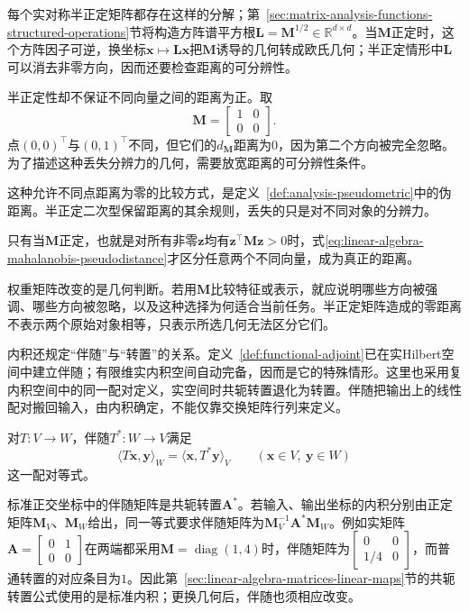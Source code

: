 每个实对称半正定矩阵都存在这样的分解；第~\ref{sec:matrix-analysis-functions-structured-operations}节将构造方阵谱平方根$\bm{L}=\bm{M}^{1/2}\in\mathbb{R}^{d\times d}$。当$\bm{M}$正定时，这个方阵因子可逆，换坐标$\bm{x}\mapsto\bm{L}\bm{x}$把$\bm{M}$诱导的几何转成欧氏几何；半正定情形中$\bm{L}$可以消去非零方向，因而还要检查距离的可分辨性。

半正定性却不保证不同向量之间的距离为正。取
\[
  \bm{M}
  =
  \begin{bmatrix} 1&0\\0&0 \end{bmatrix}.
\]
点$(0,0)^{\top}$与$(0,1)^{\top}$不同，但它们的$d_{\bm{M}}$距离为$0$，因为第二个方向被完全忽略。为了描述这种丢失分辨力的几何，需要放宽距离的可分辨性条件。

这种允许不同点距离为零的比较方式，是定义~\ref{def:analysis-pseudometric}中的伪距离。半正定二次型保留距离的其余规则，丢失的只是对不同对象的分辨力。

只有当$\bm{M}$正定，也就是对所有非零$\bm{z}$均有$\bm{z}^{\top}\bm{M}\bm{z}>0$时，式\eqref{eq:linear-algebra-mahalanobis-pseudodistance}才区分任意两个不同向量，成为真正的距离。

权重矩阵改变的是几何判断。若用$\bm{M}$比较特征或表示，就应说明哪些方向被强调、哪些方向被忽略，以及这种选择为何适合当前任务。半正定矩阵造成的零距离不表示两个原始对象相等，只表示所选几何无法区分它们。

内积还规定“伴随”与“转置”的关系。定义~\ref{def:functional-adjoint}已在实Hilbert空间中建立伴随；有限维实内积空间自动完备，因而是它的特殊情形。这里也采用复内积空间中的同一配对定义，实空间时共轭转置退化为转置。伴随把输出上的线性配对搬回输入，由内积确定，不能仅靠交换矩阵行列来定义。

对$T:V\to W$，伴随$T^*:W\to V$满足
\[
 \langle T\bm x,\bm y\rangle_W=\langle\bm x,T^*\bm y\rangle_V
 \qquad(\bm x\in V,\ \bm y\in W)
\]
这一配对等式。

标准正交坐标中的伴随矩阵是共轭转置$\bm A^*$。若输入、输出坐标的内积分别由正定矩阵$\bm M_V$、$\bm M_W$给出，同一等式要求伴随矩阵为$\bm M_V^{-1}\bm A^*\bm M_W$。例如实矩阵$\bm A=\left[\begin{smallmatrix}0&1\\0&0\end{smallmatrix}\right]$在两端都采用$\bm M=\operatorname{diag}(1,4)$时，伴随矩阵为$\left[\begin{smallmatrix}0&0\\1/4&0\end{smallmatrix}\right]$，而普通转置的对应条目为$1$。因此第~\ref{sec:linear-algebra-matrices-linear-maps}节的共轭转置公式使用的是标准内积；更换几何后，伴随也须相应改变。

